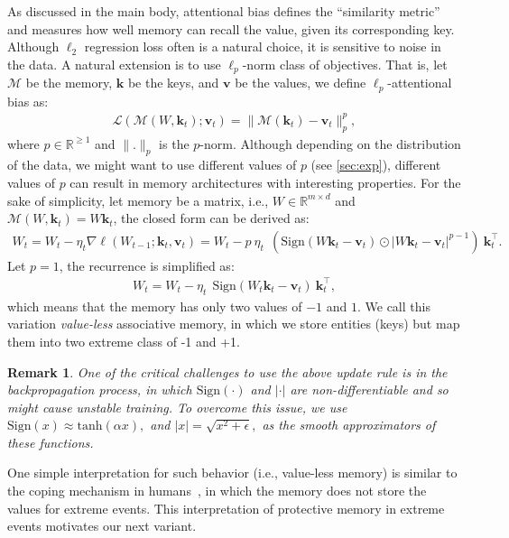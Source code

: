 \documentclass{article}
\newcommand{\citep}{\parencite}
\newcommand{\R}[0]{\mathbb{R}}
\newcommand{\vk}[0]{\mathbf{k}}
\newcommand{\vvv}[0]{\mathbf{v}}
\newcommand{\M}[0]{\mathcal{M}}
\newtheorem{remark}{Remark}
\theoremstyle{plain}
\theoremstyle{definition}
\theoremstyle{remark}
\newcommand{\head}[1]{\vspace{1.7mm}\noindent{{\textcolor{c2}{\bf #1.}}}}
\begin{document}
\head{Variant 1: $\ell_p$-Attentional Bias}
As discussed in the main body, attentional bias defines the ``similarity metric'' and measures how well memory can recall the value, given its corresponding key. Although $\ell_2$ regression loss often is a natural choice, it is sensitive to noise in the data. A natural extension is to use $\ell_p$-norm class of objectives. That is, let $\M$ be the memory, $\vk$ be the keys, and $\vvv$ be the values, we define $\ell_p$-attentional bias as:
\begin{align}
    \mathcal{L}(\M(W, \vk_t); \vvv_t) = \| \M(\vk_t) - \vvv_t \|^p_p,
\end{align}
where $p \in \mathbb{R}^{\geq 1}$ and $\|.\|_p$ is the $p$-norm. Although depending on the distribution of the data, we might want to use different values of $p$ (see \autoref{sec:exp}), different values of $p$ can result in memory architectures with interesting properties. For the sake of simplicity, let memory be a matrix, i.e., $W \in \R^{m \times d}$ and $\M(W, \vk_t) = W \vk_t$, the closed form can be derived as:
\begin{align}\label{eq:lp-attentional-bias}
    W_t = W_t - \eta_t \nabla \ell (W_{t-1}; \vk_t, \vvv_t) = W_t - p \: \eta_t \:\: \left(\mbox{Sign}(W \vk_t - \vvv_t) \odot|W \vk_t - \vvv_t|^{p-1}\right)\:\vk_t^{\top}.
\end{align}
Let $p = 1$, the recurrence is simplified as:
\begin{align}
    W_t =  W_t - \eta_t \:\: \mbox{Sign}(W_t \vk_t - \vvv_t) \:\vk_t^{\top},
\end{align}
which means that the memory has only two values of $-1$ and $1$. We call this variation \emph{value-less} associative memory, in which we store entities (keys) but map them into two extreme class of -1 and +1. 

\begin{remark}
One of the critical challenges to use the above update rule is in the backpropagation process, in which $\mbox{Sign}(\cdot)$ and $|\cdot|$ are non-differentiable and so might cause unstable training. To overcome this issue, we use $\mbox{Sign}(x) \approx \mbox{tanh}\left( \alpha x \right),$ and $|x| = \sqrt{x^2 + \epsilon},$ as the smooth approximators of these functions.  
\end{remark}

One simple interpretation for such behavior (i.e., value-less memory) is similar to the coping mechanism in humans~\citep{loftus1993reality}, in which the memory does not store the values for extreme events. This interpretation of protective memory in extreme events motivates our next variant.  
\end{document}
